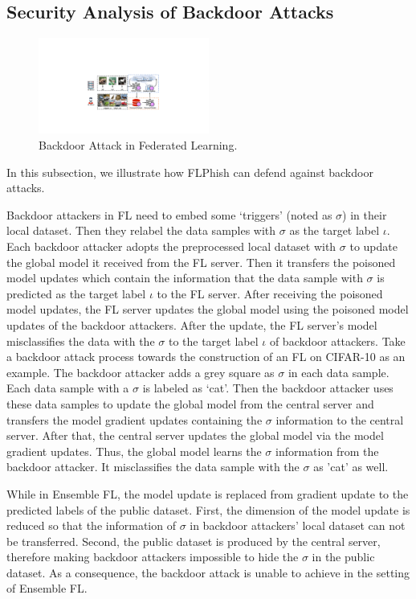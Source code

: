 \documentclass[journal]{IEEEtran}
\begin{document}
\subsection{Security Analysis of Backdoor Attacks}
\begin{figure}
  \centering
\includegraphics[width=0.5\textwidth]{figures/Figure_backdoor.pdf}
\caption{Backdoor Attack in Federated Learning.}
\label{fig_backdoor}
\end{figure}
In this subsection, we illustrate how FLPhish can defend against backdoor attacks.  
\par Backdoor attackers in FL need to embed some `triggers' (noted as $\sigma$) in their local dataset. Then they relabel the data samples with $\sigma$ as the target label $\iota$. Each backdoor attacker adopts the preprocessed local dataset with $\sigma$ to update the global model it received from the FL server. Then it transfers the poisoned model updates which contain the information that the data sample with $\sigma$ is predicted as the target label $\iota$ to the FL server. After receiving the poisoned model updates, the FL server updates the global model using the poisoned model updates of the backdoor attackers. After the update, the FL server's model misclassifies the data with the $\sigma$ to the target label $\iota$ of backdoor attackers. Take a backdoor attack process towards the construction of an FL on CIFAR-10 as an example. The backdoor attacker adds a grey square as $\sigma$ in each data sample. Each data sample with a $\sigma$ is labeled as `cat'. Then the backdoor attacker uses these data samples to update the global model from the central server and transfers the model gradient updates containing the $\sigma$ information to the central server. After that, the central server updates the global model via the model gradient updates. Thus, the global model learns the $\sigma$ information from the backdoor attacker. It misclassifies the data sample with the $\sigma$ as 'cat' as well.
\par While in Ensemble FL, the model update is replaced from gradient update to the predicted labels of the public dataset. First, the dimension of the model update is reduced so that the information of $\sigma$ in backdoor attackers' local dataset can not be transferred. Second, the public dataset is produced by the central server, therefore making backdoor attackers impossible to hide the $\sigma$ in the public dataset. As a consequence, the backdoor attack is unable to achieve in the setting of Ensemble FL.
\end{document}
